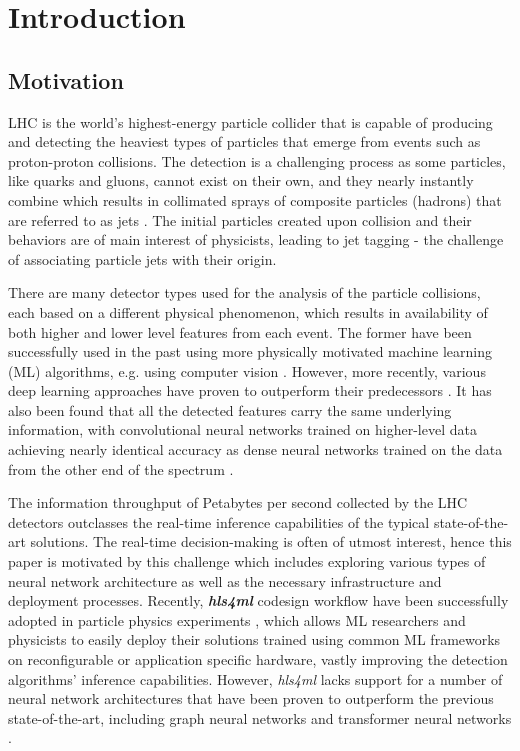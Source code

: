 \chapter{Introduction}\label{introduction}

\section{Motivation}\label{motivation}
LHC is the world's highest-energy particle collider that is capable of producing and detecting the heaviest types of particles that emerge from events such as proton-proton collisions. The detection is a challenging process as some particles, like quarks and gluons, cannot exist on their own, and they nearly instantly combine which results in collimated sprays of composite particles (hadrons) that are referred to as jets \cite{4-cernjets}. The initial particles created upon collision and their behaviors are of main interest of physicists, leading to jet tagging - the challenge of associating particle jets with their origin.

There are many detector types used for the analysis of the particle collisions, each based on a different physical phenomenon, which results in availability of both higher and lower level features from each event. The former have been successfully used in the past using more physically motivated machine learning (ML) algorithms, e.g. using computer vision \cite{5-cogan2015jet-images:}. However, more recently, various deep learning approaches have proven to outperform their predecessors \cite{6-de2016jet-images}. It has also been found that all the detected features carry the same underlying information, with convolutional neural networks trained on higher-level data achieving nearly identical accuracy as dense neural networks trained on the data from the other end of the spectrum \cite{7-moore2019reports}.

The information throughput of Petabytes per second collected by the LHC detectors outclasses the real-time inference capabilities of the typical state-of-the-art solutions. The real-time decision-making is often of utmost interest, hence this paper is motivated by this challenge which includes exploring various types of neural network architecture as well as the necessary infrastructure and deployment processes. Recently, \textit{\textbf{hls4ml}} codesign workflow have been successfully adopted in particle physics experiments \cite{8-fahim2021hls4ml:}, which allows ML researchers and physicists to easily deploy their solutions trained using common ML frameworks on reconfigurable or application specific hardware, vastly improving the detection algorithms' inference capabilities. However, \textit{hls4ml} lacks support for a number of neural network architectures that have been proven to outperform the previous state-of-the-art, including graph neural networks \cite{9-newman2019jedi-net:, 11-elabd2021graph} and transformer neural networks \cite{3-yuan2021constituentnet:}.



